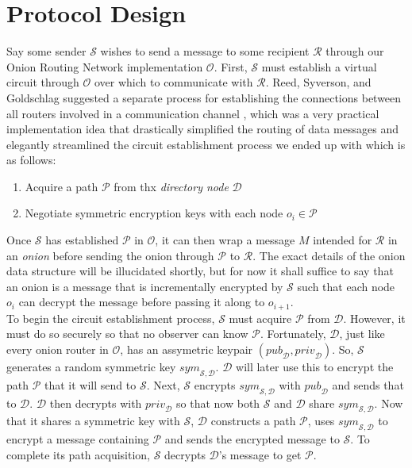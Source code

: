 \documentclass[10pt]{report}
\begin{document}
\section{Protocol Design}
Say some sender $\mathcal{S}$ wishes to send a message to some recipient $\mathcal{R}$
through our Onion Routing Network implementation $\mathcal{O}$.  First, $\mathcal{S}$
must establish a virtual circuit through $\mathcal{O}$ over which to communicate with
$\mathcal{R}$.  Reed, Syverson, and Goldschlag suggested a separate process for
establishing the connections between all routers involved in a communication channel
\cite{OnionRoutingPatent,HidingRoutingInformation}, which was a very practical implementation
idea that drastically simplified the routing of data messages and elegantly streamlined the
circuit establishment process we ended up with which is as follows:
\begin{enumerate}
    \item Acquire a path $\mathcal{P}$ from thx \textit{directory node} $\mathcal{D}$
    \item Negotiate symmetric encryption keys with each node $o_i \in \mathcal{P}$
\end{enumerate}
Once $\mathcal{S}$ has established $\mathcal{P}$ in $\mathcal{O}$, it can then wrap a message $M$
intended for $\mathcal{R}$ in an \textit{onion} before sending the onion through $\mathcal{P}$ to
$\mathcal{R}$.  The exact details of the onion data structure will be illucidated shortly, but for
now it shall suffice to say that an onion is a message that is incrementally encrypted by $\mathcal{S}$
such that each node $o_i$ can decrypt the message before passing it along to $o_{i+1}$.\\

To begin the circuit establishment process, $\mathcal{S}$ must acquire $\mathcal{P}$ from
$\mathcal{D}$.  However, it must do so securely so that no observer can know $\mathcal{P}$.
Fortunately, $\mathcal{D}$, just like every onion router in $\mathcal{O}$, has an assymetric
keypair $(\mathit{pub}_\mathcal{D}, \mathit{priv}_\mathcal{D})$.  So, $\mathcal{S}$ generates a
random symmetric key $\mathit{sym}_{\mathcal{S},\mathcal{D}}$.  $\mathcal{D}$ will later use this to encrypt
the path $\mathcal{P}$ that it will send to $\mathcal{S}$.  Next, $\mathcal{S}$ encrypts
$\mathit{sym}_{\mathcal{S},\mathcal{D}}$ with $\mathit{pub}_\mathcal{D}$ and sends that to
$\mathcal{D}$.  $\mathcal{D}$ then decrypts with $\mathit{priv}_\mathcal{D}$ so that now both
$\mathcal{S}$ and $\mathcal{D}$ share $\mathit{sym}_{\mathcal{S},\mathcal{D}}$.  Now that it shares
a symmetric key with $\mathcal{S}$, $\mathcal{D}$ constructs a path $\mathcal{P}$, uses
$\mathit{sym}_{\mathcal{S},\mathcal{D}}$ to encrypt a message containing $\mathcal{P}$ and sends
the encrypted message to $\mathcal{S}$.  To complete its path acquisition, $\mathcal{S}$ decrypts
$\mathcal{D}$'s message to get $\mathcal{P}$.\\
\end{document}
